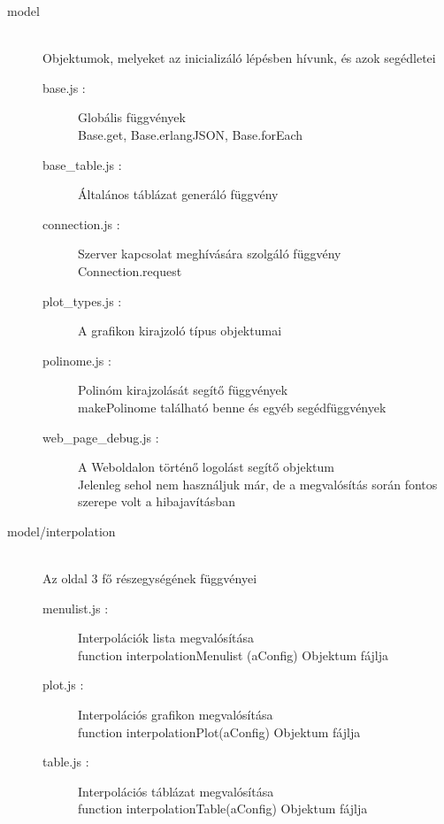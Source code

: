 \documentclass{elteikthesis}
\begin{document}
\begin{description}
		\item[model] 
		\hfill \\ Objektumok, melyeket az inicializáló lépésben hívunk, és azok segédletei
		\begin{description}
		 	\item[base.js : ] Globális függvények
		 		\hfill \\ Base.get, Base.erlangJSON, Base.forEach
		 	\item[base\_table.js : ] Általános táblázat generáló függvény
		 	\item[connection.js : ] Szerver kapcsolat meghívására szolgáló függvény
		 		\hfill \\ Connection.request
		 	\item[plot\_types.js : ] A grafikon kirajzoló típus objektumai
		 	\item[polinome.js : ] Polinóm kirajzolását segítő függvények
		 		\hfill \\ makePolinome található benne és egyéb segédfüggvények
		 	\item[web\_page\_debug.js : ] A Weboldalon történő logolást segítő objektum
		 	\hfill \\ Jelenleg sehol nem használjuk már, de a megvalósítás során fontos szerepe volt a hibajavításban
		\end{description}
		\item[model/interpolation] 
		\hfill \\ Az oldal 3 fő részegységének függvényei
			\begin{description}
			\item[menulist.js : ] Interpolációk lista megvalósítása
			\hfill \\  function interpolationMenulist (aConfig) Objektum fájlja
		  	\item[plot.js : ] Interpolációs grafikon megvalósítása
			\hfill \\  function interpolationPlot(aConfig) Objektum fájlja
			\item[table.js : ] Interpolációs táblázat megvalósítása
			\hfill \\  function interpolationTable(aConfig) Objektum fájlja
			\end{description}
	\end{description}
\end{document}
